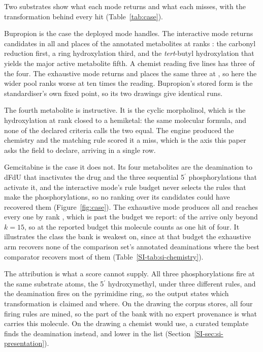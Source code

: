 

Two substrates show what each mode returns and what each misses, with the transformation behind
every hit (Table~\ref{tab:case}).

Bupropion is the case the deployed mode handles. The interactive mode returns
\numCaseBupinterCandidates{} candidates in all and places \numCaseBupinterFoundWord{} of the
\numCaseBupReferencesWord{} annotated metabolites at ranks \numCaseBupinterRanks{}: the carbonyl
reduction first, a ring hydroxylation third, and the \emph{tert}-butyl hydroxylation that yields
the major active metabolite fifth. A chemist reading five lines has three of the four. The
exhaustive mode returns \numCaseBupexhCandidates{} and places the same three at
\numCaseBupexhRanks{}, so here the wider pool ranks worse at ten times the reading. Bupropion's
stored form is the standardiser's own fixed point, so its two drawings give identical runs.

The fourth metabolite is instructive. It is the cyclic morpholinol, which is the hydroxylation at
rank \numCaseBupinterDeepest{} closed to a hemiketal: the same molecular formula, and none of the
\numCritCriteria{} declared criteria calls the two equal. The engine produced the chemistry and
the matching rule scored it a miss, which is the axis this paper asks the field to declare,
arriving in a single row.

Gemcitabine is the case it does not. Its four metabolites are the deamination to dFdU that
inactivates the drug and the three sequential 5$^\prime$ phosphorylations that activate it, and
the interactive mode's rule budget never selects the rules that make the phosphorylations, so no
ranking over its candidates could have recovered them (Figure~\ref{fig:case}). The exhaustive
mode produces all \numCaseExhFound{} and reaches every one by rank \numCaseExhDeepest{}, which
is past the budget we report: \numCaseExhPastfifteenWord{} of the \numCaseExhFoundWord{} arrive
only beyond $k=15$, so at the reported budget this molecule counts as one hit of four. It
illustrates the class the bank is weakest on, since at that budget the exhaustive arm recovers
none of the comparison set's \numChemDeamRefs{} annotated deaminations where the best comparator
recovers most of them (Table~\ref{SI-tab:si-chemistry}).

The attribution is what a score cannot supply. All three phosphorylations fire at the same
substrate atoms, the 5$^\prime$ hydroxymethyl, under three different rules, and the deamination
fires on the pyrimidine ring, so the output states which transformation is claimed and where. On
the drawing the corpus stores, all four firing rules are mined, so the part of the bank with no
expert provenance is what carries this molecule. On the drawing a chemist would use, a curated
template finds the deamination instead, and lower in the list
(Section~\ref{SI-sec:si-presentation}).

